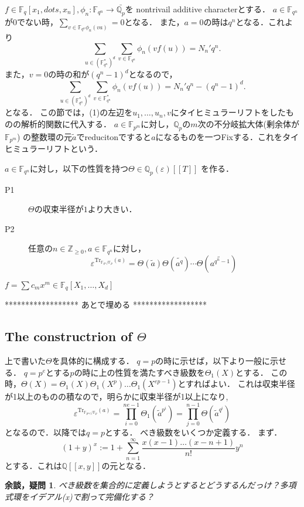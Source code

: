 \documentclass{ujarticle}
\newtheorem*{yodan}{余談，疑問}
\begin{document}
$f \in \mathbb{F}_q[x_1,dots,x_n], \phi_n: \mathbb{F}_{q^n} \to \bar{\mathbb{Q}_p}$を
nontrivail additive characterとする．
$a \in \mathbb{F}_{q^n}$が0でない時，$\sum_{v \in \mathbb{F}_{q^n}\phi_n(va)}=0$となる．
また，$a=0$の時は$q^n$となる．これより
\begin{equation*}
 \sum_{u \in (\mathbb{F}_{q^n}^*)^d} \sum_{v \in \mathbb{F}_{q^n}} \phi_n(vf(u))=
 N_n'q^n.
\end{equation*}
また，$v=0$の時の和が$(q^n-1)^d$となるので，
\begin{equation}
  \sum_{u \in (\mathbb{F}_{q^n}^*)^d} \sum_{v \in \mathbb{F}_{q^n}^*} \phi_n(vf(u))=
  N_n'q^n - (q^n-1)^d.
\end{equation}
となる．
この節では，(1)の左辺を$u_1,\dots,u_n,v$にタイヒミュラーリフトをしたものの解析的関数に代入する．
$a \in \mathbb{F}_{p^m}$に対し，$\mathbb{Q}_p$の$m$次の不分岐拡大体(剰余体が$\mathbb{F}_{p^m}$)
の整数環の元$\tilde{a}$でreducitonですると$a$になるものを一つFixする．これをタイヒミュラーリフトという．

$a \in \mathbb{F}_{q^n}$に対し，以下の性質を持つ$\Theta \in \mathbb{Q}_p(\varepsilon)[[T]]$
を作る．

\begin{description}
  \item[P1] $\Theta$の収束半径が$1$より大きい．
  \item[P2] 任意の$n \in \mathbb{Z}_{\ge 0}, a \in \mathbb{F}_{q^n}$に対し，
  \begin{equation}
    \varepsilon^{\mathrm{Tr}_{\mathbb{F}_{q^n}/\mathbb{F}_p}(a)}=
    \Theta(\tilde{a})\Theta(\tilde{a^q})\cdots\Theta(\tilde{a^{q^n-1}})
  \end{equation}
\end{description}

$f=\sum c_mx^m \in \mathbb{F}_q[X_1,\dots,X_d]$

******************
 あとで埋める
******************


\subsection{The constructrion of $\Theta$}
\label{sub:The constructrion of }
上で書いた$\Theta$を具体的に構成する．
$q=p$の時に示せば，以下より一般に示せる．
$q=p^e$とする$p$の時に上の性質を満たすべき級数を$\Theta_1(X)$とする．
この時，$\Theta(X)=\Theta_1(X)\Theta_1(X^p)\dots\Theta_1(X^{ep-1})$とすればよい．
これは収束半径が1以上のものの積なので，明らかに収束半径が1以上になり,
\begin{equation*}
 \varepsilon^{\mathrm{Tr}_{\mathbb{F}_{p^ne}/\mathbb{F}_p}(a)}=
 \prod_{i=0}^{ne-1} \Theta_1(\tilde{a}^{p^i})　 =
 \prod_{j=0}^{n-1}\Theta(\tilde{a}^{q^i})
\end{equation*}
となるので．以降では$q=p$とする．
べき級数をいくつか定義する．
まず．
\begin{equation*}
 (1+y)^x:=1+\sum_{n=1}^{\infty}\frac{x(x-1)\dots(x-n+1)}{n!}y^n
\end{equation*}
とする．これは$\mathbb{Q}[[x,y]]$の元となる．
\begin{yodan}
 べき級数を集合的に定義しようとするとどうするんだっけ？多項式環をイデアル(x)で割って完備化する？
\end{yodan}
\end{document}
